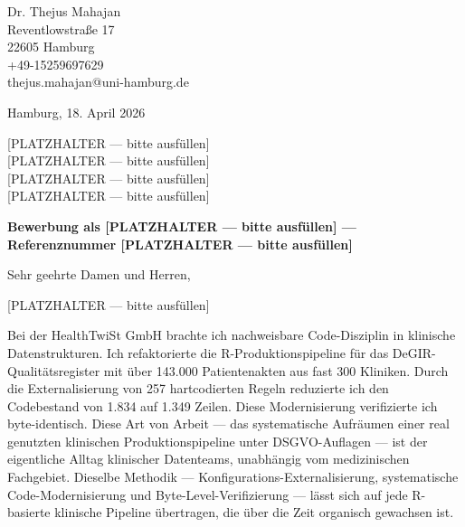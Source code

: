 \documentclass[11pt, a4paper]{article}
\begin{document}
\pagestyle{empty}

\begin{flushleft}
Dr. Thejus Mahajan\\
Reventlowstra{\ss}e 17\\
22605 Hamburg\\
+49-15259697629\\
thejus.mahajan@uni-hamburg.de
\end{flushleft}

\vspace{0.3cm}

\begin{flushright}
Hamburg, 18. April 2026
\end{flushright}

\vspace{0.3cm}

\begin{flushleft}
{[PLATZHALTER --- bitte ausf\"ullen]}\\
{[PLATZHALTER --- bitte ausf\"ullen]}\\
{[PLATZHALTER --- bitte ausf\"ullen]}\\
{[PLATZHALTER --- bitte ausf\"ullen]}
\end{flushleft}

\vspace{0.3cm}

\textbf{Bewerbung als [PLATZHALTER --- bitte ausf\"ullen] --- Referenznummer [PLATZHALTER --- bitte ausf\"ullen]}

\vspace{0.3em}
Sehr geehrte Damen und Herren,

{[PLATZHALTER --- bitte ausf\"ullen]}

Bei der HealthTwiSt GmbH brachte ich nachweisbare Code-Disziplin in klinische Datenstrukturen. Ich refaktorierte die R-Produktionspipeline f\"ur das DeGIR-Qualit\"atsregister mit \"uber 143.000 Patientenakten aus fast 300 Kliniken. Durch die Externalisierung von 257 hartcodierten Regeln reduzierte ich den Codebestand von 1.834 auf 1.349 Zeilen. Diese Modernisierung verifizierte ich byte-identisch. Diese Art von Arbeit --- das systematische Aufr\"aumen einer real genutzten klinischen Produktionspipeline unter DSGVO-Auflagen --- ist der eigentliche Alltag klinischer Datenteams, unabh\"angig vom medizinischen Fachgebiet. Dieselbe Methodik --- Konfigurations-Externalisierung, systematische Code-Modernisierung und Byte-Level-Verifizierung --- l\"asst sich auf jede R-basierte klinische Pipeline \"ubertragen, die \"uber die Zeit organisch gewachsen ist.
\end{document}
